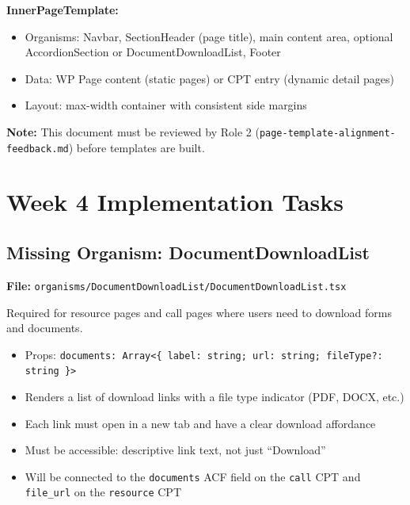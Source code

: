 \documentclass[12pt,a4paper]{article}
\begin{document}
\vspace{0.8em}
\noindent\textbf{InnerPageTemplate:}

\begin{itemize}
    \item Organisms: Navbar, SectionHeader (page title), main content area, optional AccordionSection or DocumentDownloadList, Footer
    \item Data: WP Page content (static pages) or CPT entry (dynamic detail pages)
    \item Layout: max-width container with consistent side margins
\end{itemize}

\begin{bluebox}
\textbf{Note:} This document must be reviewed by Role 2 (\texttt{page-template-alignment-feedback.md})
before templates are built.
\end{bluebox}

\section{Week 4 Implementation Tasks}

\subsection{Missing Organism: DocumentDownloadList}

\textbf{File:} \texttt{organisms/DocumentDownloadList/DocumentDownloadList.tsx}

Required for resource pages and call pages where users need to download forms and documents.

\begin{itemize}
    \item[$\square$] Props: \texttt{documents: Array<\{ label: string; url: string; fileType?: string \}>}
    \item[$\square$] Renders a list of download links with a file type indicator (PDF, DOCX, etc.)
    \item[$\square$] Each link must open in a new tab and have a clear download affordance
    \item[$\square$] Must be accessible: descriptive link text, not just ``Download''
    \item[$\square$] Will be connected to the \texttt{documents} ACF field on the \texttt{call} CPT and \texttt{file\_url} on the \texttt{resource} CPT
\end{itemize}
\end{document}
